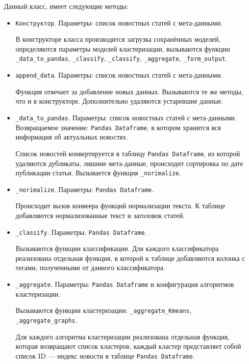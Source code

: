 Данный класс, имеет следующие методы:
\begin{itemize}
    \item \verb|Конструктор|. Параметры: список новостных статей с мета-данными.

    В конструкторе класса производится загрузка сохранённых моделей, определяются параметры моделей кластеризации, вызываются
    функции \verb|_data_to_pandas|, \verb|_classify|, \verb|_classify|, \verb|_aggregate|, \verb|_form_output|.

    \item \verb|append_data|. Параметры: список новостных статей с мета-данными.

    Функция отвечает за добавление новых данных. Вызываются те же методы, что и
    в конструкторе. Дополнительно удаляются устаревшие данные.

    \item \verb|_data_to_pandas|. Параметры: список новостных статей с мета-данными. Возвращаемое значение: \verb|Pandas Dataframe|, в котором 
    хранится вся информация об актуальных новостях.

    Список новостей конвертируется в таблицу \verb|Pandas Dataframe|, из которой
    удаляются дубликаты, лишние мета-данные, происходит сортировка по дате 
    публикации статьи. Вызывается функция \verb|_norimalize|.

    \item \verb|_norimalize|. Параметры: \verb|Pandas Dataframe|.

    Происходит вызов конвеера функций нормализации текста. К таблице
    добавляются нормализованные текст и заголовок статей.

    \item \verb|_classify|. Параметры: \verb|Pandas Dataframe|.

    Вызываются функции классификации. Для каждого классификатора реализована отдельная функция, в которой к таблице добавляются колонка с тегами,
    полученными от данного классификатора.

    \item \verb|_aggregate|. Параметры: \verb|Pandas Dataframe| и 
    конфигурация алгоритмов кластеризации.

    Вызываются функции кластеризации: \verb|_aggregate_Kmeans|,
    \verb|_aggregate_graphs|.

    Для каждого алгоритма кластеризации реализована отдельная функция, которая возвращают список кластеров, каждый кластер представляет
    собой список ID --- индекс новости в таблице \verb|Pandas Dataframe|.


\end{itemize}
